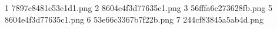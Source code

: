1 7897c8481e53e1d1.png
2 8604e4f3d77635c1.png
3 56fffa6c273628fb.png
5 8604e4f3d77635c1.png
6 53e66c3367b7f22b.png
7 244cf83845a5ab4d.png

